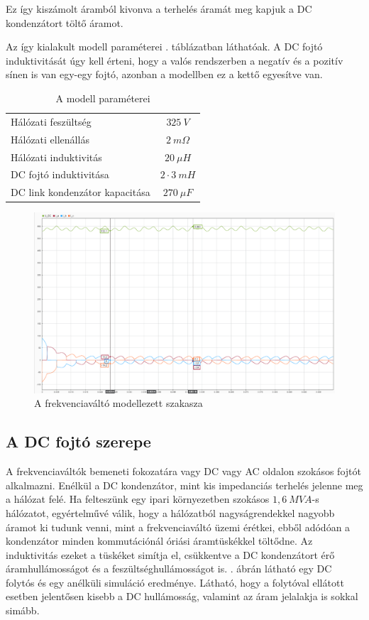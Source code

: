 Ez így kiszámolt áramból kivonva a terhelés áramát meg kapjuk a DC kondenzátort töltő áramot.

Az így kialakult modell paraméterei . táblázatban láthatóak. A DC fojtó induktivitását úgy kell érteni, hogy a valós rendszerben a negatív és a pozitív sínen is van egy-egy fojtó, azonban a modellben ez a kettő egyesítve van.

\begin{table}[H]
\centering
\begin{tabular}{lS}
Hálózati feszültség            & $325\ V$ 		\\
Hálózati ellenállás            & $2\ m\Omega$   \\
Hálózati induktivitás          & $20\ \mu{}H$    			\\
DC fojtó induktivitása         & $2 \cdot{} 3\ mH$    			\\
DC link kondenzátor kapacitása & $270\ \mu{}F $   
\end{tabular}
\caption{A modell paraméterei}
\label{parameters}
\end{table}

\begin{figure}[H]
	\centering
	\includegraphics[width = \textwidth]{figures/continous_testrun_1.png}
	\caption{A frekvenciaváltó modellezett szakasza} 
	\label{fig:cont_run}
\end{figure}

\subsection{A DC fojtó szerepe}

A frekvenciaváltók bemeneti fokozatára vagy DC vagy AC oldalon szokásos fojtót alkalmazni. Enélkül a DC kondenzátor, mint kis impedanciás terhelés jelenne meg a hálózat felé. Ha felteszünk egy ipari környezetben szokásos $1,6\ MVA$-s hálózatot, egyértelművé válik, hogy a hálózatból nagyságrendekkel nagyobb áramot ki tudunk venni, mint a frekvenciaváltó üzemi érétkei, ebből adódóan a kondenzátor minden kommutációnál óriási áramtüskékkel töltődne. Az induktivitás ezeket a tüskéket simítja el, csükkentve a DC kondenzátort érő áramhullámosságot és a feszültséghullámosságot is. . ábrán látható egy DC folytós és egy anélküli simuláció eredménye. Látható, hogy a folytóval ellátott esetben jelentősen kisebb a DC hullámosság, valamint az áram jelalakja is sokkal simább.

